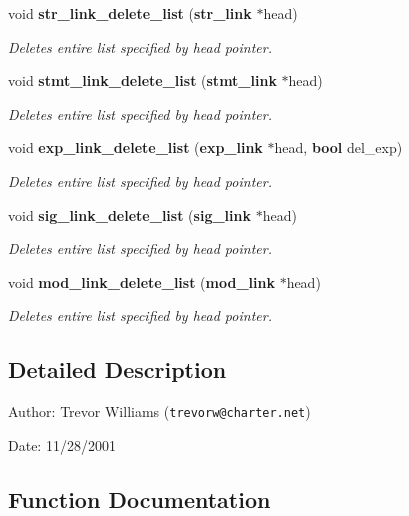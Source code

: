 \begin{CompactItemize}
void {\bf str\_\-link\_\-delete\_\-list} ({\bf str\_\-link} $\ast$head)
\begin{CompactList}\small\item\em Deletes entire list specified by head pointer.\item\end{CompactList}\item 
void {\bf stmt\_\-link\_\-delete\_\-list} ({\bf stmt\_\-link} $\ast$head)
\begin{CompactList}\small\item\em Deletes entire list specified by head pointer.\item\end{CompactList}\item 
void {\bf exp\_\-link\_\-delete\_\-list} ({\bf exp\_\-link} $\ast$head, {\bf bool} del\_\-exp)
\begin{CompactList}\small\item\em Deletes entire list specified by head pointer.\item\end{CompactList}\item 
void {\bf sig\_\-link\_\-delete\_\-list} ({\bf sig\_\-link} $\ast$head)
\begin{CompactList}\small\item\em Deletes entire list specified by head pointer.\item\end{CompactList}\item 
void {\bf mod\_\-link\_\-delete\_\-list} ({\bf mod\_\-link} $\ast$head)
\begin{CompactList}\small\item\em Deletes entire list specified by head pointer.\item\end{CompactList}\end{CompactItemize}


\subsection{Detailed Description}
\begin{Desc}
\item[Author:]Trevor Williams ({\tt trevorw@charter.net}) \end{Desc}
\begin{Desc}
\item[Date:]11/28/2001\end{Desc}


\subsection{Function Documentation}

